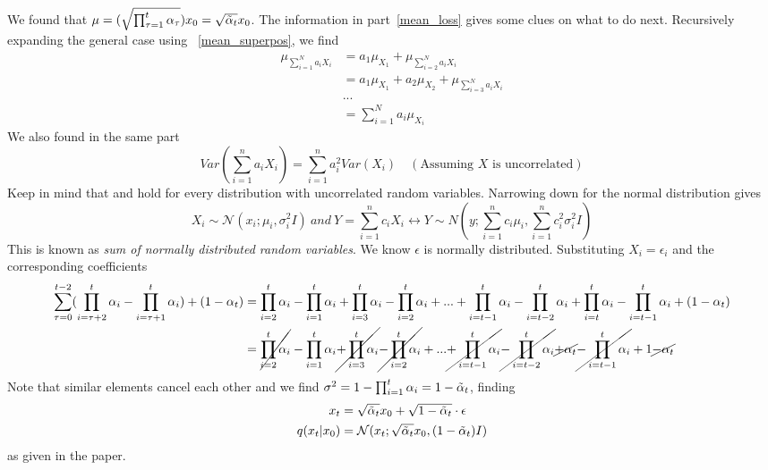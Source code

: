 \documentclass{article}
\numberwithin{equation}{subsection}
\begin{document}
We found that $\mu = (\sqrt{\prod_{\tau=1}^{t}\alpha_\tau})x_0 = \sqrt{\Tilde{\alpha}_t}x_0$. The information in part~\ref{mean_loss} gives some clues on what to do next. Recursively expanding the general case using ~\ref{mean_superpos}, we find
\begin{align}
    \mu_{\sum_{i=1}^N a_i X_i} &= a_1\mu_{X_1} + \mu_{\sum_{i=2}^N a_i X_i}\\
    &= a_1\mu_{X_1} + a_2\mu_{X_2} + \mu_{\sum_{i=3}^N a_i X_i}\\
    & ...\\
    &= \sum_{i=1}^N a_i \mu_{X_i}
    \label{meansum}
\end{align}
We also found in the same part
\begin{equation}
    Var(\sum_{i=1}^{n} a_i X_i) = \sum_{i=1}^{n} a_i^2 Var(X_i) \quad (\text{Assuming $X$ is uncorrelated})
    \label{varsum}
\end{equation}
Keep in mind that \label{meansum} and \label{varsum} hold for every distribution with uncorrelated random variables. Narrowing down for the normal distribution gives
\begin{equation}
    X_i \sim \mathcal{N}(x_i; \mu_i, \sigma_i^2 I)\ and\ Y = \sum_{i=1}^{n}c_iX_i \longleftrightarrow Y \sim N(y; \sum_{i=1}^{n}c_i\mu_i,\sum_{i=1}^{n}c_i^2\sigma_i^2 I)
\end{equation}
This is known as \textit{sum of normally distributed random variables}.
We know $\epsilon$ is normally distributed. Substituting $X_i = \epsilon_i$ and the corresponding coefficients 
\begin{align}
    \sum_{\tau=0}^{t-2}(\prod_{i=\tau+2}^{t}\alpha_i-\prod_{i=\tau+1}^{t}\alpha_i)+(1-\alpha_t) &= \prod_{i=2}^{t}\alpha_i-\prod_{i=1}^{t}\alpha_i+\prod_{i=3}^{t}\alpha_i-\prod_{i=2}^{t}\alpha_i+...+\prod_{i=t-1}^{t}\alpha_i-\prod_{i=t-2}^{t}\alpha_i+\prod_{i=t}^{t}\alpha_i-\prod_{i=t-1}^{t}\alpha_i+(1-\alpha_t)\\
    &= \cancel{\prod_{i=2}^{t}\alpha_i}-\prod_{i=1}^{t}\alpha_i\cancel{+\prod_{i=3}^{t}\alpha_i}\cancel{-\prod_{i=2}^{t}\alpha_i}+...\cancel{+\prod_{i=t-1}^{t}\alpha_i}\cancel{-\prod_{i=t-2}^{t}\alpha_i}\cancel{+\alpha_t}\cancel{-\prod_{i=t-1}^{t}\alpha_i}+1\cancel{-\alpha_t}
\end{align}
Note that similar elements cancel each other and we find $\sigma^2 = 1-\prod_{i=1}^{t}\alpha_i = 1 - \Tilde{\alpha}_t$, finding 
\begin{align}
    x_t &= \sqrt{\Tilde{\alpha}_t}x_0 + \sqrt{1 - \Tilde{\alpha}_t} \cdot \epsilon\\
    q(x_t|x_0) &= \mathcal{N}(x_t;\sqrt{\Tilde{\alpha}_t}x_0,(1 - \Tilde{\alpha}_t)I)
\end{align}
as given in the paper.
\end{document}
